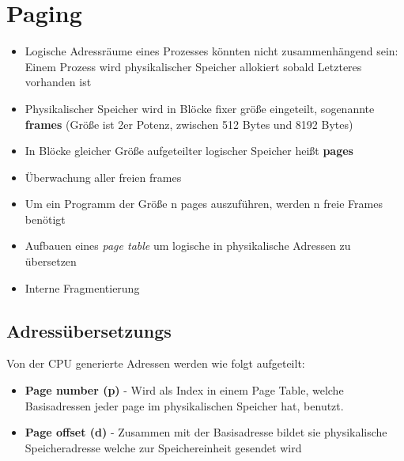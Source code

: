 \documentclass[a4paper]{scrreprt}
\begin{document}
\section{Paging}
\begin{itemize}
\item Logische Adressräume eines Prozesses könnten nicht zusammenhängend sein: Einem Prozess wird physikalischer Speicher allokiert sobald Letzteres vorhanden ist
\item Physikalischer Speicher wird in Blöcke fixer größe eingeteilt, sogenannte \textbf{frames} (Größe ist 2er Potenz, zwischen 512 Bytes und 8192 Bytes)
\item In Blöcke gleicher Größe aufgeteilter logischer Speicher heißt \textbf{pages}
\item Überwachung aller freien frames
\item Um ein Programm der Größe n pages auszuführen, werden n freie Frames benötigt
\item Aufbauen eines \textit{page table} um logische in physikalische Adressen zu übersetzen
\item Interne Fragmentierung
\end{itemize}

\subsection{Adressübersetzungs}
Von der CPU generierte Adressen werden wie folgt aufgeteilt:
\begin{itemize}
\item \textbf{Page number (p)} - Wird als Index in einem Page Table, welche Basisadressen jeder page im physikalischen Speicher hat, benutzt.
\item \textbf{Page offset (d)} - Zusammen mit der Basisadresse bildet sie physikalische Speicheradresse welche zur Speichereinheit gesendet wird
\end{itemize}
\end{document}
